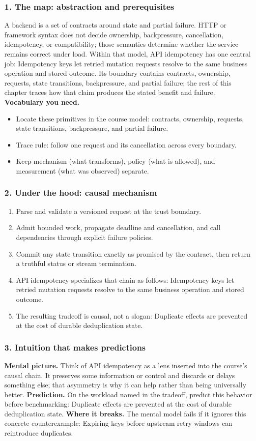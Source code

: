 \subsubsection*{1. The map: abstraction and prerequisites}
A backend is a set of contracts around state and partial failure. HTTP or framework syntax does not decide ownership, backpressure, cancellation, idempotency, or compatibility; those semantics determine whether the service remains correct under load.
Within that model, API idempotency has one central job: Idempotency keys let retried mutation requests resolve to the same business operation and stored outcome. Its boundary contains contracts, ownership, requests, state transitions, backpressure, and partial failure; the rest of this chapter traces how that claim produces the stated benefit and failure.
\textbf{Vocabulary you need.}\begin{itemize}
\item Locate these primitives in the course model: contracts, ownership, requests, state transitions, backpressure, and partial failure.
\item Trace rule: follow one request and its cancellation across every boundary.
\item Keep mechanism (what transforms), policy (what is allowed), and measurement (what was observed) separate.
\end{itemize}
\subsubsection*{2. Under the hood: causal mechanism}\begin{enumerate}
\item Parse and validate a versioned request at the trust boundary.
\item Admit bounded work, propagate deadline and cancellation, and call dependencies through explicit failure policies.
\item Commit any state transition exactly as promised by the contract, then return a truthful status or stream termination.
\item API idempotency specializes that chain as follows: Idempotency keys let retried mutation requests resolve to the same business operation and stored outcome.
\item The resulting tradeoff is causal, not a slogan: Duplicate effects are prevented at the cost of durable deduplication state.
\end{enumerate}
\subsubsection*{3. Intuition that makes predictions}
\textbf{Mental picture.} Think of API idempotency as a lens inserted into the course's causal chain. It preserves some information or control and discards or delays something else; that asymmetry is why it can help rather than being universally better.
\textbf{Prediction.} On the workload named in the tradeoff, predict this behavior before benchmarking: Duplicate effects are prevented at the cost of durable deduplication state.
\textbf{Where it breaks.} The mental model fails if it ignores this concrete counterexample: Expiring keys before upstream retry windows can reintroduce duplicates.
